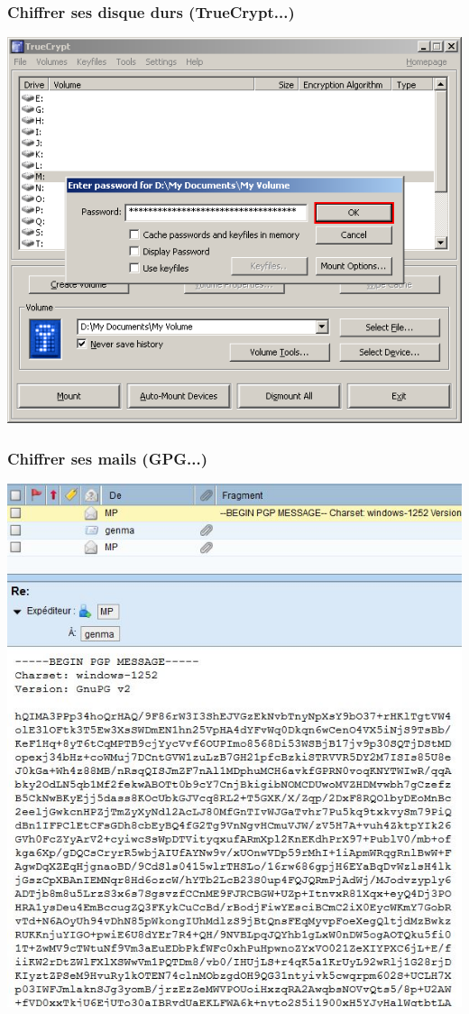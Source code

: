 \documentclass{beamer}
\begin{document}
\begin{frame}
\frametitle{Chiffrer ses disque durs (TrueCrypt...)}
\begin{center}
\includegraphics[scale=0.4] {./images/Truecrypt18.png}
\end{center}
\end{frame}

\begin{frame}
\frametitle{Chiffrer ses mails  (GPG...)}
\begin{center}
\includegraphics[scale=0.5] {./images/chiffrement_mail.jpg}
\end{center}
\end{frame}
\end{document}

